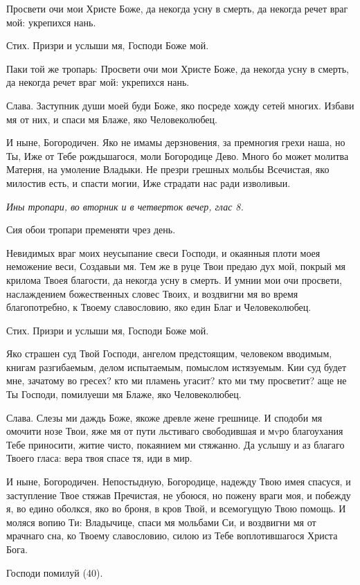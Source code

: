 Просвети очи мои Христе Боже, да некогда усну в смерть, да некогда речет враг мой: укрепихся нань.

Стих. Призри и услыши мя, Господи Боже мой. 

Паки той же тропарь: Просвети очи мои Христе Боже, да некогда усну в смерть, да некогда речет враг мой: укрепихся нань.

Слава. Заступник души моей буди Боже, яко посреде хожду сетей многих. Избави мя от них, и спаси мя Блаже, яко Человеколюбец.

И ныне, Богородичен. Яко не имамы дерзновения, за премногия грехи наша, но Ты, Иже от Тебе рождьшагося, моли Богородице Дево. Много бо может молитва Матерня, на умоление Владыки. Не презри грешных мольбы Всечистая, яко милостив есть, и спасти могии, Иже страдати нас ради изволивыи.


\itshape Ины тропари, во вторник и в четверток вечер, глас 8.\normalfont{}

Сия обои тропари пременяти чрез день.

Невидимых враг моих неусыпание свеси Господи, и окаянныя плоти моея неможение веси, Создавыи мя. Тем же в руце Твои предаю дух мой, покрый мя крилома Твоея благости, да некогда усну в смерть. И умнии мои очи просвети, наслаждением божественных словес Твоих, и воздвигни мя во время  благопотребно, к Твоему славословию, яко един Благ и Человеколюбец.

Стих. Призри и услыши мя, Господи Боже мой. 

Яко страшен суд Твой Господи, ангелом предстоящим, человеком вводимым, книгам разгибаемым, делом испытаемым, помыслом истязуемым. Кии суд будет мне, зачатому во гресех? кто ми пламень угасит? кто ми тму просветит? аще не Ты Господи, помилуеши мя Блаже, яко Человеколюбец.

Слава. Слезы ми даждь Боже, якоже древле жене грешнице. И сподоби мя омочити нозе Твои, яже мя от пути льстиваго свободившая и мvро благоухания Тебе приносити, житие чисто, покаянием ми стяжанно. Да услышу и аз благаго Твоего гласа: вера твоя спасе тя, иди в мир.

И ныне, Богородичен. Непостыдную, Богородице, надежду Твою имея спасуся, и заступление Твое стяжав Пречистая, не убоюся, но пожену враги моя, и побежду я, во едино оболкся, яко во броня, в кров Твой, и всемогущую Твою помощь. И моляся вопию Ти: Владычице, спаси мя мольбами Си, и воздвигни мя от мрачнаго сна, ко Твоему славословию, силою из Тебе воплотившагося Христа Бога.

Господи помилуй (40). 

